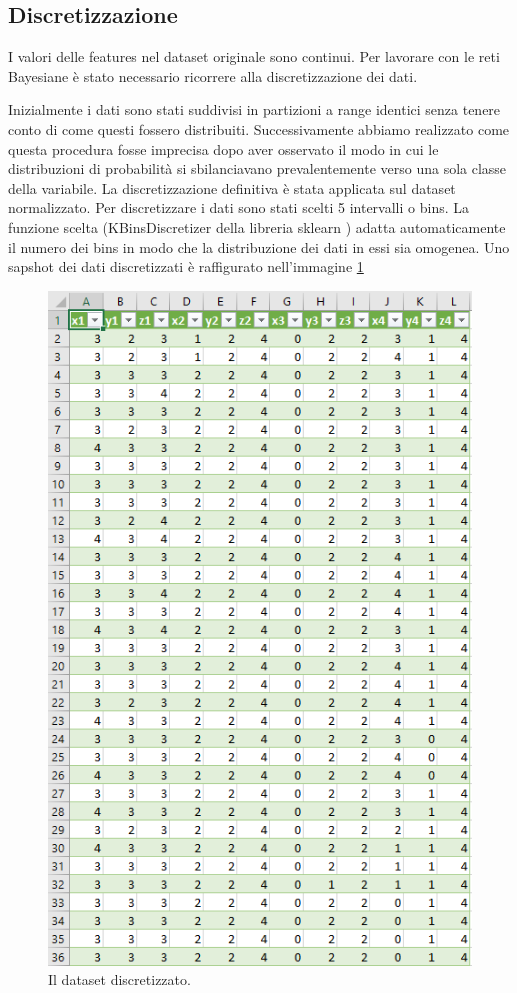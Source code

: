 \documentclass[12pt]{article}
\begin{document}
\subsection{Discretizzazione}
I valori delle features nel dataset originale sono continui. Per lavorare con le reti Bayesiane è stato necessario ricorrere alla discretizzazione dei dati.\par
Inizialmente i dati sono stati suddivisi in partizioni a range identici senza tenere conto di come questi fossero distribuiti. Successivamente abbiamo realizzato come questa procedura fosse imprecisa dopo aver osservato il modo in cui le distribuzioni di probabilità si sbilanciavano prevalentemente verso una sola classe della variabile. \newline
La discretizzazione definitiva è stata applicata sul dataset normalizzato. Per discretizzare i dati sono stati scelti 5 intervalli o bins. La funzione scelta (KBinsDiscretizer della libreria sklearn \cite{scikit-learn}) adatta automaticamente il numero dei bins in modo che la distribuzione dei dati in essi sia omogenea. Uno sapshot dei dati discretizzati è raffigurato nell'immagine \ref{fig:discretized}

\begin{figure}[h]
	\includegraphics[scale = 0.5]{images/datasetDiscretizzato.PNG}
	\caption{Il dataset discretizzato.}
	\label{fig:discretized}
\end{figure}
\end{document}
